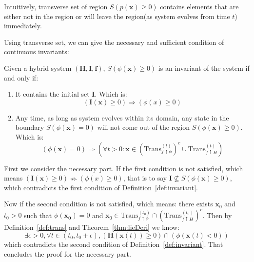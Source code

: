 \documentclass{jssc}
\begin{document}
Intuitively, transverse set of region $S(p(\boldsymbol{x}) \geq 0)$ contains elements that are either not in the region or will leave the region(as system evolves from time $t$) immediately.

Using transverse set, we can give the necessary and sufficient condition of continuous invariants:

\begin{theorem}
\label{thm:trans}
Given a hybrid system $(\boldsymbol{H}, \boldsymbol{I}, \boldsymbol{f})$, $S(\phi(\boldsymbol{x}) \geq 0)$ is an invariant of the system if and only if:
	\begin{enumerate}
		\item It contains the initial set $\boldsymbol{I}$. Which is:
			\begin{equation*}
				(\boldsymbol{I}(\boldsymbol{x}) \geq 0) \Rightarrow (\phi(x) \geq 0)
			\end{equation*}
		\item Any time, as long as system evolves within its domain, any state in the boundary $S(\phi(\boldsymbol{x}) = 0)$ will not come out of the region $S(\phi(\boldsymbol{x}) \geq 0)$. Which is:
			\begin{equation*}
				(\phi(\boldsymbol{x}) = 0) \Rightarrow (\forall t>0: \boldsymbol{x} \in (\mathrm{Trans}_{f \uparrow \phi}^{(t)})^c \cup \mathrm{Trans}_{f \uparrow H}^{(t)})
			\end{equation*}
	\end{enumerate}
\end{theorem}

\proof
First we consider the necessary part. If the first condition is not satisfied, which means $(\boldsymbol{I}(\boldsymbol{x}) \geq 0) \nRightarrow (\phi(x) \geq 0)$, that is to say $\boldsymbol{I} \not\subseteq S(\phi(\boldsymbol{x}) \geq 0)$, which contradicts the first condition of Definition~\ref{def:invariant}.

Now if the second condition is not satisfied, which means: there exists $\boldsymbol{x}_0$ and $t_0 > 0$ such that $\phi(\boldsymbol{x_0}) = 0$ and $\boldsymbol{x}_0 \in \mathrm{Trans}_{f \uparrow \phi}^{(t_0)} \cap (\mathrm{Trans}_{f \uparrow H}^{(t_0)})^c$. Then by Definition~\ref{def:trans} and Theorem~\ref{thm:lieDeri} we know:
\begin{equation*}
		\exists \epsilon > 0, \forall t \in (t_0, t_0 + \epsilon), (\boldsymbol{H}(\boldsymbol{x}(t)) \geq 0) \cap (\phi(\boldsymbol{x}(t) < 0))
\end{equation*}
which contradicts the second condition of Definition~\ref{def:invariant}. That concludes the proof for the necessary part.
\end{document}
